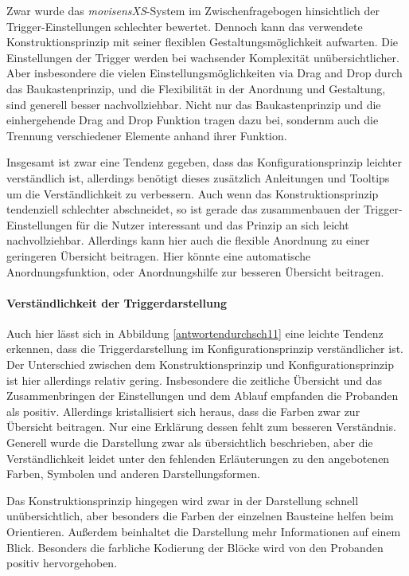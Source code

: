 Zwar wurde das \emph{movisensXS}-System im Zwischenfragebogen hinsichtlich der Trigger-Einstellungen schlechter bewertet. Dennoch kann das verwendete Konstruktionsprinzip mit seiner flexiblen Gestaltungsmöglichkeit aufwarten. Die Einstellungen der Trigger werden bei wachsender Komplexität unübersichtlicher. Aber insbesondere die vielen Einstellungsmöglichkeiten via Drag and Drop durch das Baukastenprinzip, und die Flexibilität in der Anordnung und Gestaltung, sind generell besser nachvollziehbar. Nicht nur das Baukastenprinzip und die einhergehende Drag and Drop Funktion tragen dazu bei, sondernm auch die Trennung verschiedener Elemente anhand ihrer Funktion. 

Insgesamt ist zwar eine Tendenz gegeben, dass das Konfigurationsprinzip leichter verständlich ist, allerdings benötigt dieses zusätzlich Anleitungen und Tooltips um die Verständlichkeit zu verbessern. Auch wenn das Konstruktionsprinzip tendenziell schlechter abschneidet, so ist gerade das zusammenbauen der Trigger-Einstellungen für die Nutzer interessant und das Prinzip an sich leicht nachvollziehbar. Allerdings kann hier auch die flexible Anordnung zu einer geringeren Übersicht beitragen. Hier könnte eine automatische Anordnungsfunktion, oder Anordnungshilfe zur besseren Übersicht beitragen.


\paragraph{Verständlichkeit der Triggerdarstellung}
Auch hier lässt sich in Abbildung \ref{antwortendurchsch11} eine leichte Tendenz erkennen, dass die Triggerdarstellung im Konfigurationsprinzip verständlicher ist. Der Unterschied zwischen dem Konstruktionsprinzip und Konfigurationsprinzip ist hier allerdings relativ gering. Insbesondere die zeitliche Übersicht und das Zusammenbringen der Einstellungen und dem Ablauf empfanden die Probanden als positiv. Allerdings kristallisiert sich heraus, dass die Farben zwar zur Übersicht beitragen. Nur eine Erklärung dessen fehlt zum besseren Verständnis. Generell wurde die Darstellung zwar als übersichtlich beschrieben, aber die Verständlichkeit leidet unter den fehlenden Erläuterungen zu den angebotenen Farben, Symbolen und anderen Darstellungsformen. 

Das Konstruktionsprinzip hingegen wird zwar in der Darstellung schnell unübersichtlich, aber besonders die Farben der einzelnen Bausteine helfen beim Orientieren. Außerdem beinhaltet die Darstellung mehr Informationen auf einem Blick. Besonders die farbliche Kodierung der Blöcke wird von den Probanden positiv hervorgehoben. 

